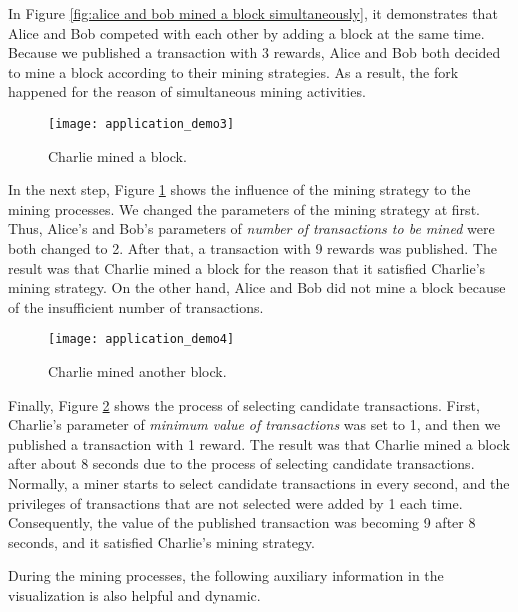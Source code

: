 In Figure \ref{fig:alice and bob mined a block simultaneously}, it demonstrates that Alice and Bob competed with each other by adding a block at the same time. Because we published a transaction with 3 rewards, Alice and Bob both decided to mine a block according to their mining strategies. As a result, the fork happened for the reason of simultaneous mining activities.

\begin{figure}[htb]
    \centering
    \texttt{[image: application\_demo3]}
    \caption{Charlie mined a block.}
    \label{fig:charlie mined a block}
\end{figure}

In the next step, Figure \ref{fig:charlie mined a block} shows the influence of the mining strategy to the mining processes. We changed the parameters of the mining strategy at first. Thus, Alice's and Bob's parameters of \textit{number of transactions to be mined} were both changed to 2. After that, a transaction with 9 rewards was published. The result was that Charlie mined a block for the reason that it satisfied Charlie's mining strategy. On the other hand, Alice and Bob did not mine a block because of the insufficient number of transactions.

\begin{figure}[htb]
    \centering
    \texttt{[image: application\_demo4]}
    \caption{Charlie mined another block.}
    \label{fig:charlie mined another block}
\end{figure}

Finally, Figure \ref{fig:charlie mined another block} shows the process of selecting candidate transactions. First, Charlie's parameter of \textit{minimum value of transactions} was set to 1, and then we published a transaction with 1 reward. The result was that Charlie mined a block after about 8 seconds due to the process of selecting candidate transactions. Normally, a miner starts to select candidate transactions in every second, and the privileges of transactions that are not selected were added by 1 each time. Consequently, the value of the published transaction was becoming 9 after 8 seconds, and it satisfied Charlie's mining strategy.

During the mining processes, the following auxiliary information in the visualization is also helpful and dynamic.

